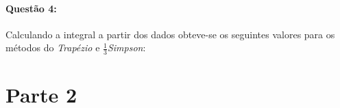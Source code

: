 \documentclass[a4paper,11pt]{article}
\begin{document}

\paragraph{Questão 4:}Calculando a integral a partir dos dados obteve-se os seguintes valores para os métodos do \textit{Trapézio} e $\frac{1}{3}$\textit{Simpson}:
\section{Parte 2}

\end{document}
